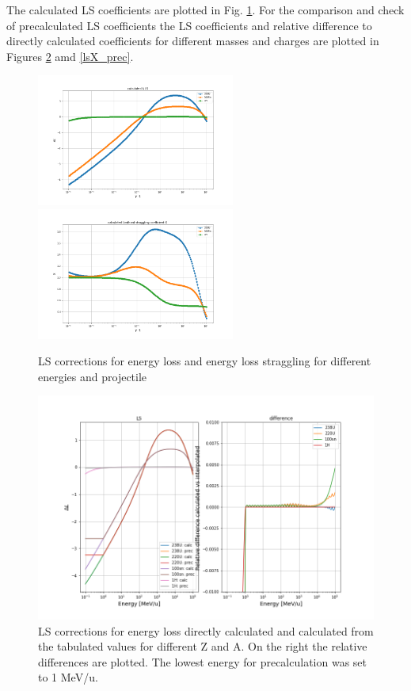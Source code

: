 \documentclass[12pt,a4paper]{article}
\begin{document}
The calculated LS coefficients are plotted in Fig. \ref{ls}. 
For the comparison and check of precalculated LS coefficients the LS coefficients and relative difference to directly calculated coefficients for different masses and charges are plotted in Figures \ref{ls_prec} amd \ref{lsX_prec}.

\begin{figure}
\centering
\includegraphics[width=6.5cm]{plots/ls.png}
\includegraphics[width=6.5cm]{plots/lsX.png}
\caption{LS corrections for energy loss and energy loss straggling for different energies and projectile}
\label{ls}
\end{figure}

\begin{figure}
\centering
\includegraphics[width=12cm]{plots/ls_precision.png}
\caption{LS corrections for energy loss directly calculated and calculated from the tabulated values for different Z and A. On the right the relative differences are plotted. The lowest energy for precalculation was set to 1 MeV/u.}
\label{ls_prec}
\end{figure}
\end{document}
